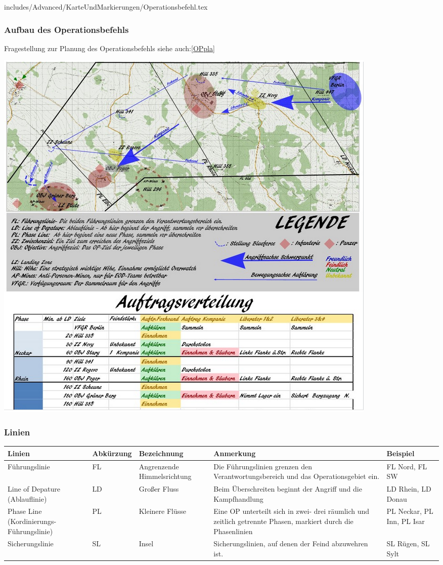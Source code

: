 \newpage

includes/Advanced/KarteUndMarkierungen/Operationsbefehl.tex
\subsubsection{Aufbau des Operationsbefehls}
\label{OPbef}
Fragestellung zur Planung des Operationsbefehls siehe auch:\ref{OPpla}

\begin{minipage}[t]{1\textwidth}
	\includegraphics[width=\textwidth]{./img/fortgeschrittenes/karteUndMarkierungen/OP-Befehl.png}
\end{minipage}

\subsubsection{Linien}
\begin{longtable}{|p{3cm}|p{}|p{}|p{4cm}|p{}|} 																											\hline
	Linien				&		Abkürzung			&		Bezeichnung				&			Anmerkung 									&		Beispiel 			\\ \hline
	Führungslinie			&		FL				&		Angrenzende Himmelsrichtung	&			Die Führungslinien grenzen \newline den Verantwortungsbereich und \newline das Operationsgebiet ein. & FL Nord, FL SW \\ \hline
	Line of Depature (Ablauflinie)&		LD				&		Großer Fluss				&			Beim Überschreiten beginnt der Angriff und die Kampfhandlung 	&	LD Rhein, LD Donau			\\ \hline
	Phase Line (Kordinierungs-Führungslinie) & PL				&		Kleinere Flüsse			&			Eine OP unterteilt sich in zwei- drei räumlich und zeitlich getrennte Phasen, markiert durch die Phasenlinien	& PL Neckar, PL Inn, PL Isar	\\ \hline
	Sicherungslinie 		&		SL 				&		Insel					&			Sicherungslinien, auf denen der Feind abzuwehren ist.		&	SL Rügen, SL Sylt			\\ \hline
\end{longtable}

